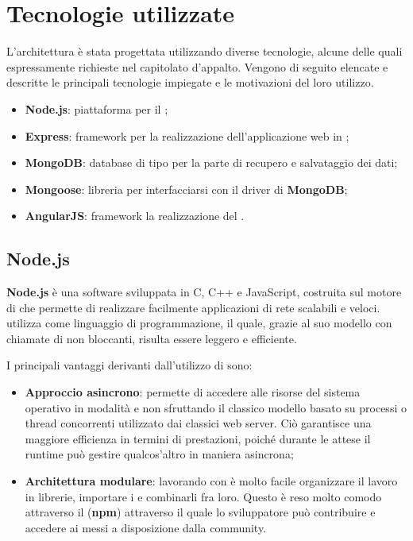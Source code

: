 \section{Tecnologie utilizzate}


L'architettura è stata progettata utilizzando diverse tecnologie, alcune delle quali espressamente richieste nel capitolato d'appalto. Vengono di seguito elencate e descritte le principali tecnologie impiegate e le motivazioni del loro utilizzo.

\begin{itemize}
	\item \textbf{Node.js}: piattaforma per il ;
	\item \textbf{Express}: framework per la realizzazione dell’applicazione web in ;
	\item \textbf{MongoDB}: database di tipo  per la parte di recupero e salvataggio dei dati;
	\item \textbf{Mongoose}: libreria per interfacciarsi con il driver di \textbf{MongoDB};
	\item \textbf{AngularJS}: framework  la realizzazione del .
\end{itemize}


\subsection{Node.js}
\textbf{Node.js} è una  software sviluppata in C, C++ e JavaScript, costruita sul motore  di  che permette di realizzare facilmente applicazioni di rete scalabili e veloci.  utilizza  come linguaggio di programmazione, il quale, grazie al suo modello  con chiamate di  non bloccanti, risulta essere leggero e efficiente.

I principali vantaggi derivanti dall'utilizzo di  sono:
\begin{itemize}
	\item \textbf{Approccio asincrono}:  permette di accedere alle risorse del sistema operativo in modalità  e non sfruttando il classico modello basato su processi o thread concorrenti utilizzato dai classici web server. Ciò garantisce una maggiore efficienza in termini di prestazioni, poiché durante le attese il runtime può gestire qualcos'altro in maniera asincrona;
	\item \textbf{Architettura modulare}: lavorando con  è molto facile organizzare il lavoro in librerie, importare i  e combinarli fra loro. Questo è reso molto comodo attraverso il  (\textbf{npm}) attraverso il quale lo sviluppatore può contribuire e accedere ai  messi a disposizione dalla community.
\end{itemize}

